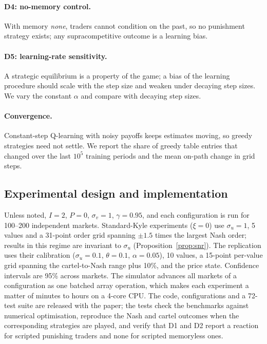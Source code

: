 \paragraph{D4: no-memory control.} With memory \emph{none}, traders cannot
condition on the past, so no punishment strategy exists; any supracompetitive
outcome is a learning bias.

\paragraph{D5: learning-rate sensitivity.} A strategic equilibrium is a
property of the game; a bias of the learning procedure should scale with the
step size and weaken under decaying step sizes. We vary the constant $\alpha$
and compare with decaying step sizes.

\paragraph{Convergence.} Constant-step Q-learning with noisy payoffs keeps
estimates moving, so greedy strategies need not settle. We report the share
of greedy table entries that changed over the last $10^5$ training periods and
the mean on-path change in grid steps.

\subsection{Experimental design and implementation}

Unless noted, $I=2$, $P=0$, $\sigma_v=1$, $\gamma=0.95$, and each configuration
is run for 100--200 independent markets. Standard-Kyle experiments
($\xi=0$) use $\sigma_u=1$, 5 values and a 31-point order grid spanning
$\pm1.5$ times the largest Nash order; results in this regime are invariant to
$\sigma_u$ (Proposition~\ref{prop:snr}). The \citet{dou2025} replication uses
their calibration ($\sigma_u=0.1$, $\theta=0.1$, $\alpha=0.05$), 10 values, a
15-point per-value grid spanning the cartel-to-Nash range plus 10\%, and the
price state. Confidence intervals are 95\% across markets. The simulator
advances all markets of a configuration as one batched array operation, which
makes each experiment a matter of minutes to hours on a 4-core CPU. The code,
configurations and a 72-test suite are released with the paper; the tests
check the benchmarks against numerical optimisation, reproduce the Nash and
cartel outcomes when the corresponding strategies are played, and verify that
D1 and D2 report a reaction for scripted punishing traders and none for
scripted memoryless ones.
